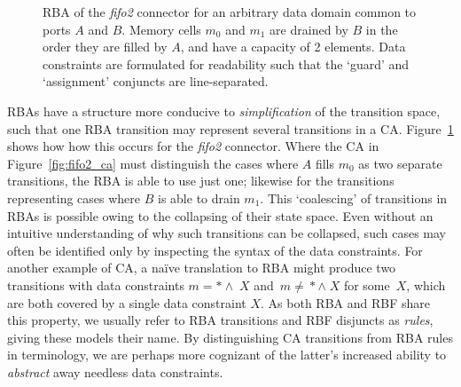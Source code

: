 \begin{figure}[ht]
	\centering
	\caption[RBA for fifo2 connector.]{RBA of the \textit{fifo2} connector for an arbitrary data domain common to ports $A$ and $B$. Memory cells $m_0$ and $m_1$ are drained by $B$ in the order they are filled by $A$, and have a capacity of 2 elements. Data constraints are formulated for readability such that the `guard' and `assignment' conjuncts are line-separated.}
	\label{fig:fifo2_rba}
\end{figure}



RBAs have a structure more conducive to \textit{simplification} of the transition space, such that one RBA transition may represent several transitions in a CA. Figure~\ref{fig:fifo2_rba} shows how how this occurs for the \textit{fifo2} connector. Where the CA in Figure~\ref{fig:fifo2_ca} must distinguish the cases where $A$ fills $m_0$ as two separate transitions, the RBA is able to use just one; likewise for the transitions representing cases where $B$ is able to drain $m_1$. This `coalescing' of transitions in RBAs is possible owing to the collapsing of their state space. Even without an intuitive understanding of why such transitions can be collapsed, such cases may often be identified only by inspecting the syntax of the data constraints. For another example of CA, a na{\"i}ve translation to RBA might produce two transitions with data constraints $m=*\wedge{}\;X$ and~$m\neq{}*\wedge{}\;X$ for some~$X$, which are both covered by a single data constraint $X$. As both RBA and RBF share this property, we usually refer to RBA transitions and RBF disjuncts as \textit{rules}, giving these models their name. By distinguishing CA transitions from RBA rules in terminology, we are perhaps more cognizant of the latter's increased ability to \textit{abstract} away needless data constraints. 

